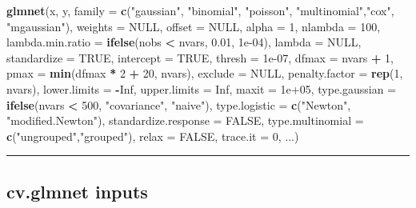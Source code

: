 \documentclass[
]{article}
\newenvironment{Shaded}{\begin{snugshade}}{\end{snugshade}}
\newcommand{\DataTypeTok}[1]{\textcolor[rgb]{0.13,0.29,0.53}{#1}}
\newcommand{\DecValTok}[1]{\textcolor[rgb]{0.00,0.00,0.81}{#1}}
\newcommand{\FloatTok}[1]{\textcolor[rgb]{0.00,0.00,0.81}{#1}}
\newcommand{\KeywordTok}[1]{\textcolor[rgb]{0.13,0.29,0.53}{\textbf{#1}}}
\newcommand{\NormalTok}[1]{#1}
\newcommand{\OperatorTok}[1]{\textcolor[rgb]{0.81,0.36,0.00}{\textbf{#1}}}
\newcommand{\OtherTok}[1]{\textcolor[rgb]{0.56,0.35,0.01}{#1}}
\newcommand{\StringTok}[1]{\textcolor[rgb]{0.31,0.60,0.02}{#1}}
\begin{document}
\begin{Shaded}
\begin{Highlighting}[]
\KeywordTok{glmnet}\NormalTok{(x, y, }
 \DataTypeTok{family =} \KeywordTok{c}\NormalTok{(}\StringTok{"gaussian"}\NormalTok{, }\StringTok{"binomial"}\NormalTok{, }\StringTok{"poisson"}\NormalTok{, }\StringTok{"multinomial"}\NormalTok{,}\StringTok{"cox"}\NormalTok{, }\StringTok{"mgaussian"}\NormalTok{),}
 \DataTypeTok{weights =} \OtherTok{NULL}\NormalTok{, }\DataTypeTok{offset =} \OtherTok{NULL}\NormalTok{, }\DataTypeTok{alpha =} \DecValTok{1}\NormalTok{, }\DataTypeTok{nlambda =} \DecValTok{100}\NormalTok{, }
 \DataTypeTok{lambda.min.ratio =} \KeywordTok{ifelse}\NormalTok{(nobs }\OperatorTok{<}\StringTok{ }\NormalTok{nvars, }\FloatTok{0.01}\NormalTok{, }\FloatTok{1e-04}\NormalTok{),}
 \DataTypeTok{lambda =} \OtherTok{NULL}\NormalTok{, }\DataTypeTok{standardize =} \OtherTok{TRUE}\NormalTok{, }\DataTypeTok{intercept =} \OtherTok{TRUE}\NormalTok{,}
 \DataTypeTok{thresh =} \FloatTok{1e-07}\NormalTok{, }\DataTypeTok{dfmax =}\NormalTok{ nvars }\OperatorTok{+}\StringTok{ }\DecValTok{1}\NormalTok{, }
 \DataTypeTok{pmax =} \KeywordTok{min}\NormalTok{(dfmax }\OperatorTok{*}\StringTok{ }\DecValTok{2} \OperatorTok{+}\StringTok{ }\DecValTok{20}\NormalTok{, nvars), }
 \DataTypeTok{exclude =} \OtherTok{NULL}\NormalTok{, }\DataTypeTok{penalty.factor =} \KeywordTok{rep}\NormalTok{(}\DecValTok{1}\NormalTok{, nvars),}
 \DataTypeTok{lower.limits =} \OperatorTok{-}\OtherTok{Inf}\NormalTok{, }\DataTypeTok{upper.limits =} \OtherTok{Inf}\NormalTok{, }\DataTypeTok{maxit =} \FloatTok{1e+05}\NormalTok{,}
 \DataTypeTok{type.gaussian =} \KeywordTok{ifelse}\NormalTok{(nvars }\OperatorTok{<}\StringTok{ }\DecValTok{500}\NormalTok{, }\StringTok{"covariance"}\NormalTok{, }\StringTok{"naive"}\NormalTok{),}
 \DataTypeTok{type.logistic =} \KeywordTok{c}\NormalTok{(}\StringTok{"Newton"}\NormalTok{, }\StringTok{"modified.Newton"}\NormalTok{),}
 \DataTypeTok{standardize.response =} \OtherTok{FALSE}\NormalTok{, }
 \DataTypeTok{type.multinomial =} \KeywordTok{c}\NormalTok{(}\StringTok{"ungrouped"}\NormalTok{,}\StringTok{"grouped"}\NormalTok{), }
 \DataTypeTok{relax =} \OtherTok{FALSE}\NormalTok{, }\DataTypeTok{trace.it =} \DecValTok{0}\NormalTok{, ...)}
\end{Highlighting}
\end{Shaded}

\begin{center}\rule{0.5\linewidth}{0.5pt}\end{center}

\hypertarget{cv.glmnet-inputs}{%
\subsection{cv.glmnet inputs}\label{cv.glmnet-inputs}}
\end{document}
